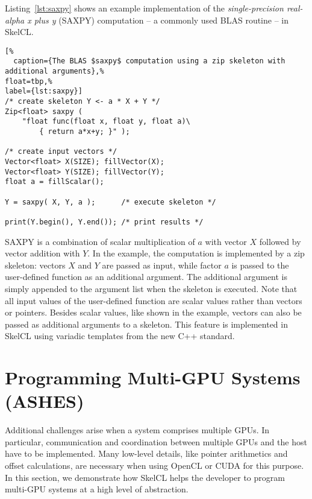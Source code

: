 Listing~\ref{lst:saxpy} shows an example implementation of the \emph{single-precision real-alpha x plus y} (SAXPY) computation -- a commonly used BLAS routine -- in SkelCL.
\begin{lstlisting}[%
  caption={The BLAS $saxpy$ computation using a zip skeleton with additional arguments},%
float=tbp,%
label={lst:saxpy}]
/* create skeleton Y <- a * X + Y */
Zip<float> saxpy (
    "float func(float x, float y, float a)\
        { return a*x+y; }" );

/* create input vectors */
Vector<float> X(SIZE); fillVector(X);
Vector<float> Y(SIZE); fillVector(Y);
float a = fillScalar();

Y = saxpy( X, Y, a );      /* execute skeleton */

print(Y.begin(), Y.end()); /* print results */
\end{lstlisting}
SAXPY is a combination of scalar multiplication of $a$ with vector $X$ followed by vector addition with $Y$.
In the example, the computation is implemented by a zip skeleton:
vectors $X$ and $Y$ are passed as input, while factor $a$ is passed to the user-defined function as an additional argument.
The additional argument is simply appended to the argument list when the skeleton is executed.
Note that all input values of the user-defined function are scalar values rather than vectors or pointers.
Besides scalar values, like shown in the example, vectors can also be passed as additional arguments to a skeleton.
This feature is implemented in SkelCL using variadic templates from the new C++ standard\cite{gregor08, c++11}.

\section{Programming Multi-GPU Systems (ASHES)}

Additional challenges arise when a system comprises multiple GPUs.
In particular, communication and coordination between multiple GPUs and the host have to be implemented.
Many low-level details, like pointer arithmetics and offset calculations, are necessary when using OpenCL or CUDA for this purpose.
In this section, we demonstrate how SkelCL helps the developer to program multi-GPU systems at a high level of abstraction.


